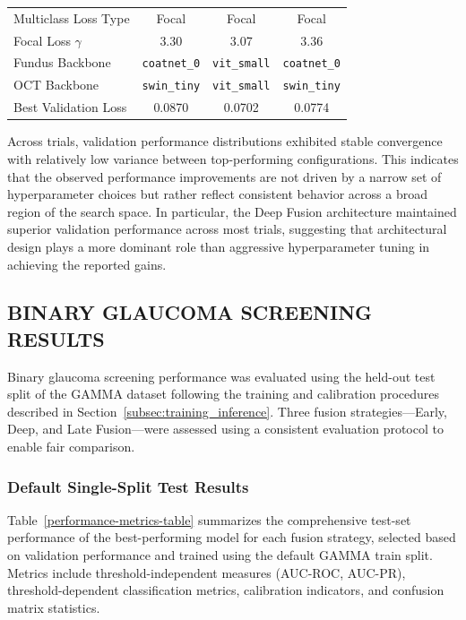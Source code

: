 \documentclass[preprint,12pt]{elsarticle}
\begin{document}
\begin{table}[htb]
\begin{tabular}{|l|c|c|c|}
        Multiclass Loss Type    & Focal                 & Focal                & Focal                \\
        Focal Loss $\gamma$     & 3.30                  & 3.07                 & 3.36                 \\
        Fundus Backbone         & \texttt{coatnet\_0}   & \texttt{vit\_small}  & \texttt{coatnet\_0}  \\
        OCT Backbone            & \texttt{swin\_tiny}   & \texttt{vit\_small}  & \texttt{swin\_tiny}  \\
        \hline
        Best Validation Loss    & 0.0870                & 0.0702               & 0.0774               \\
        \hline
    \end{tabular}
\end{table}

Across trials, validation performance distributions exhibited stable convergence with relatively low variance between top-performing configurations. This indicates that the observed performance improvements are not driven by a narrow set of hyperparameter choices but rather reflect consistent behavior across a broad region of the search space. In particular, the Deep Fusion architecture maintained superior validation performance across most trials, suggesting that architectural design plays a more dominant role than aggressive hyperparameter tuning in achieving the reported gains.

\subsection{BINARY GLAUCOMA SCREENING RESULTS}
\label{subsec:binary_results}

Binary glaucoma screening performance was evaluated using the held-out test split of the GAMMA dataset following the training and calibration procedures described in Section~\ref{subsec:training_inference}. Three fusion strategies—Early, Deep, and Late Fusion—were assessed using a consistent evaluation protocol to enable fair comparison.

\subsubsection{Default Single-Split Test Results}
Table~\ref{performance-metrics-table} summarizes the comprehensive test-set performance of the best-performing model for each fusion strategy, selected based on validation performance and trained using the default GAMMA train split. Metrics include threshold-independent measures (AUC-ROC, AUC-PR), threshold-dependent classification metrics, calibration indicators, and confusion matrix statistics.
\end{document}
